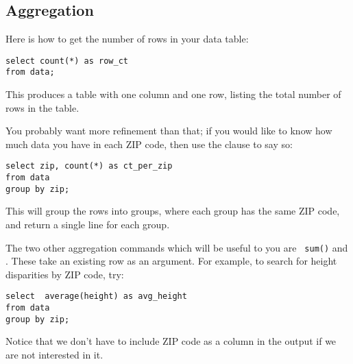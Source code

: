 \subsection{Aggregation}
Here is how to get the number of rows in your data table:
\begin{lstlisting}
select count(*) as row_ct 
from data;
\end{lstlisting}
This produces a table with one column and one row, listing the total number of rows in the  table.


You probably want more refinement than that; if you would like to
know how much data you have in each ZIP code, then use the  clause to say so:
\begin{lstlisting}
select zip, count(*) as ct_per_zip
from data
group by zip;
\end{lstlisting}
This will group the rows into groups, where each group has the same ZIP
code, and return a single line for each group.


The two other aggregation commands which will be useful to you are {\tt
sum()} and . These take an existing row as an argument.
For example, to search for height disparities by ZIP code, try:
\begin{lstlisting}
select  average(height) as avg_height
from data
group by zip;
\end{lstlisting}
Notice that we don't have to include ZIP code as a column in the output
if we are not interested in it.

